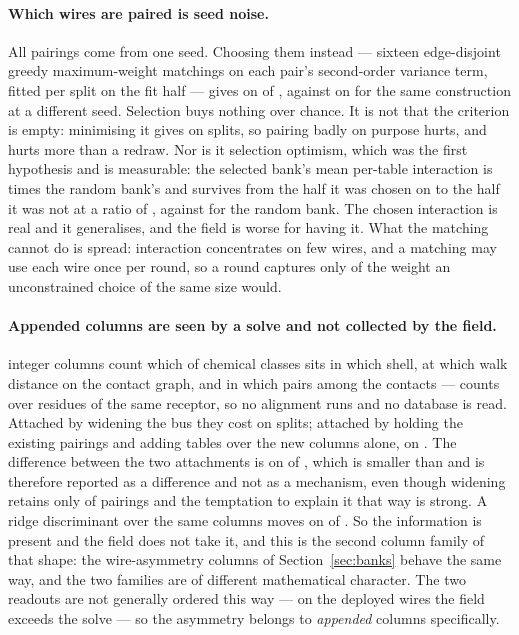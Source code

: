 \documentclass[11pt]{article}
\begin{document}
\paragraph{Which wires are paired is seed noise.} All \CompTablesFull{} pairings
come from one seed. Choosing them instead --- sixteen edge-disjoint greedy
maximum-weight matchings on each pair's second-order variance term, fitted per
split on the fit half --- gives \PairInter{} on \PairInterSplits{} of
\LadderSplits{}, against \PairReseed{} on \PairReseedSplits{} for the same
construction at a different seed. Selection buys nothing over chance. It is not
that the criterion is empty: minimising it gives \PairAnti{} on
\PairAntiSplits{} splits, so pairing badly on purpose hurts, and hurts more than a
redraw. Nor is it selection optimism, which was the first hypothesis and is
measurable: the selected bank's mean per-table interaction is
\PairInteractionRatio{} times the random bank's and survives from the half it was
chosen on to the half it was not at a ratio of \PairSurviveSelected{}, against
\PairSurviveRandom{} for the random bank. The chosen interaction is real and it
generalises, and the field is worse for having it. What the matching cannot do is
spread: interaction concentrates on few wires, and a matching may use each wire
once per round, so a round captures only \PairGreedyIdeal{} of the weight an
unconstrained choice of the same size would.

\paragraph{Appended columns are seen by a solve and not collected by the field.}
\CompCols{} integer columns count which of \CompClasses{} chemical classes sits in
which shell, at which walk distance on the contact graph, and in which pairs among
the contacts --- counts over residues of the same receptor, so no alignment runs
and no database is read. Attached by widening the bus they cost \CompWidened{} on
\CompWidenedSplits{} splits; attached by holding the existing pairings and adding
tables over the new columns alone, \CompUnion{} on \CompUnionSplits{}. The
difference between the two attachments is \CompUnionMinusWidened{} on
\CompUnionMinusWidenedSplits{} of \LadderSplits{}, which is smaller than
\SatReseed{} and is therefore reported as a difference and not as a mechanism,
even though widening retains only \CompSurvived{} of \CompTablesFull{} pairings
and the temptation to explain it that way is strong. A ridge discriminant over the
same columns moves \CompFisher{} on \CompFisherSplits{} of \LadderSplits{}. So the
information is present and the field does not take it, and this is the second
column family of that shape: the wire-asymmetry columns of
Section~\ref{sec:banks} behave the same way, and the two families are of different
mathematical character. The two readouts are not generally ordered this way ---
on the deployed wires the field exceeds the solve --- so the asymmetry belongs to
\emph{appended} columns specifically.
\end{document}

